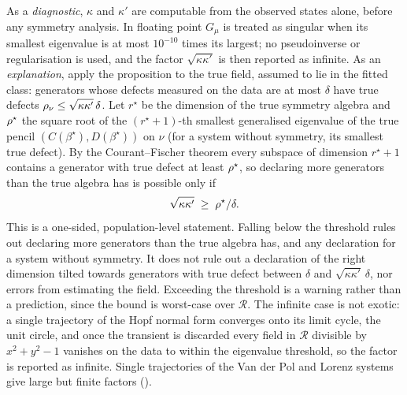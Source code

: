 As a \emph{diagnostic}, $\kappa$ and $\kappa'$ are computable from the observed
states alone, before any symmetry analysis. In floating point $G_\mu$ is
treated as singular when its smallest eigenvalue is at most $10^{-10}$ times
its largest; no pseudoinverse or regularisation is used, and the factor
$\sqrt{\kappa\kappa'}$ is then reported as infinite. As an
\emph{explanation}, apply the proposition to the true field, assumed to lie
in the fitted class: generators whose defects measured on the data are at
most $\delta$ have true defects $\rho_\nu \le \sqrt{\kappa\kappa'}\,\delta$.
Let $r^\star$ be the dimension of the true symmetry algebra and
$\rho^\star$ the square root of the $(r^\star{+}1)$-th smallest
generalised eigenvalue of the true pencil $(C(\beta^\star), D(\beta^\star))$
on $\nu$ (for a system without symmetry, its smallest true defect). By the
Courant--Fischer theorem every subspace of dimension $r^\star + 1$ contains a
generator with true defect at least $\rho^\star$, so declaring more
generators than the true algebra has is possible only if
\begin{equation}
  \sqrt{\kappa\kappa'} \;\ge\; \rho^\star / \delta .
  \label{eq:kappacrit}
\end{equation}
This is a one-sided, population-level statement. Falling below the threshold
rules out declaring more generators than the true algebra has, and any
declaration for a system without symmetry. It does not rule out a declaration
of the right dimension tilted towards generators with true defect between
$\delta$ and $\sqrt{\kappa\kappa'}\,\delta$, nor errors from estimating the
field. Exceeding the threshold is a warning rather than a prediction, since
the bound is worst-case over $\mathcal R$. The infinite case is not exotic: a
single trajectory of the Hopf normal form converges onto its limit cycle, the
unit circle, and once the transient is discarded every field in $\mathcal R$
divisible by $x^2 + y^2 - 1$ vanishes on the data to within the eigenvalue
threshold, so the factor is reported as infinite. Single trajectories of the
Van der Pol and Lorenz systems give large but finite factors
(\STtrajectory).

